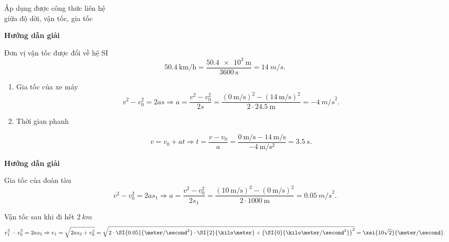 \begin{dang}{Áp dụng được công thức liên hệ \\giữa độ dời, vận tốc, gia tốc }
	{	\begin{center}
			\textbf{Hướng dẫn giải}
		\end{center}
		
		Đơn vị vận tốc được đổi về hệ SI $$\SI{50,4}{\kilo\meter/\hour} =\dfrac{\SI{50.4e3}{\meter}}{\SI{3600}{\second}}= \SI{14}{m/s}.$$
		\begin{enumerate}[label=\alph*.]
			\item Gia tốc của xe máy
			$$v^2-v_0^2 =2as \Rightarrow a =\dfrac{v^2 - v_0^2}{2s}=\dfrac{\left(\SI{0}{\meter/\second}\right)^{2}-\left(\SI{14}{\meter/\second}\right)^{2}}{2\cdot\SI{24.5}{\meter}}=\SI{-4}{m/s}^2.$$
			\item Thời gian phanh
			
			$$v =v_0 +at \Rightarrow t = \dfrac{v-v_0}{a} =\dfrac{\SI{0}{\meter/\second}-\SI{14}{\meter/\second}}{\SI{-4}{\meter/\second^{2}}}= \SI{3,5}{s}.$$
		\end{enumerate}
			}
	{	\begin{center}
			\textbf{Hướng dẫn giải}
		\end{center}
		
		Gia tốc của đoàn tàu
		$$v^2-v_0^2 =2as_1 \Rightarrow a = \dfrac{v^2-v_0^2}{2s_1}=\dfrac{\left(\SI{10}{\meter/\second}\right)^2-(\SI{0}{\meter/\second})^2}{2\cdot\SI{1000}{\meter}} =\SI{0,05}{m/s}^2.$$
		
		Vận tốc sau khi đi hết $\SI{2}{km}$
		$$v_1^2 - v_0^2 = 2as_2 \Rightarrow  v_1 =\sqrt{2as_2+v_0^2}=\sqrt{2\cdot\SI{0.05}{\meter/\second^{2}}\cdot\SI{2}{\kilo\meter}+\left(\SI{0}{\kilo\meter/\second^{2}}\right)^{2}} =\xsi{10\sqrt{2}}{\meter/\second}.$$
	}
\end{dang}

